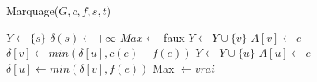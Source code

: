 \documentclass[11pt,a4paper]{report}
\begin{document}
\begin{algorithm}
\caption{Marquage($G, c, f, s, t$)}
\begin{algorithmic}[1]
\STATE $Y \leftarrow \{s\}$
\STATE $\delta(s) \leftarrow +\infty$
\STATE $Max \leftarrow $ faux
\STATE $Y \leftarrow Y \cup \{v\}$
\STATE $A[v] \leftarrow e$
\STATE $\delta[v] \leftarrow min(\delta[u], c(e) -f(e))$
\ELSE {} 
\STATE  $Y \leftarrow Y \cup \{u\}$
\STATE $A[u] \leftarrow e$
\STATE $\delta[u] \leftarrow min(\delta[v], f(e))$
\ELSE 
\STATE Max $\leftarrow vrai$ 
\ENDIF
\ENDIF
\ENDWHILE
\end{algorithmic}
\end{algorithm}

\nocite{CLRS09, CLRS10, Xuo92, CGH97, GM09, Even79, Saka84}



\end{document}
